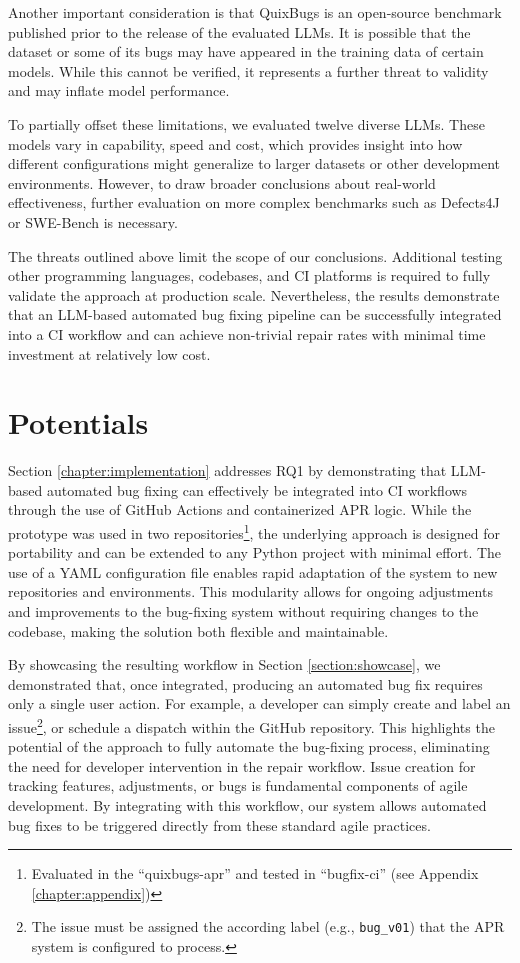 Another important consideration is that QuixBugs is an open-source benchmark published prior to the release of the evaluated \acp{LLM}. It is possible that the dataset or some of its bugs may have appeared in the training data of certain models. While this cannot be verified, it represents a further threat to validity and may inflate model performance.

To partially offset these limitations, we evaluated twelve diverse \acp{LLM}. These models vary in capability, speed and cost, which provides insight into how different configurations might generalize to larger datasets or other development environments. However, to draw broader conclusions about real-world effectiveness, further evaluation on more complex benchmarks such as Defects4J or SWE-Bench is necessary.

The threats outlined above limit the scope of our conclusions. Additional testing other programming languages, codebases, and CI platforms is required to fully validate the approach at production scale. Nevertheless, the results demonstrate that an LLM-based automated bug fixing pipeline can be successfully integrated into a CI workflow and can achieve non-trivial repair rates with minimal time investment at relatively low cost.

\section{Potentials}

Section \ref{chapter:implementation} addresses RQ1 by demonstrating that LLM-based automated bug fixing can effectively be integrated into \ac{CI} workflows through the use of GitHub Actions and containerized APR logic. While the prototype was used in two repositories\footnote{Evaluated in the ``quixbugs-apr'' and tested in ``bugfix-ci'' (see Appendix \ref{chapter:appendix})}, the underlying approach is designed for portability and can be extended to any Python project with minimal effort. The use of a YAML configuration file enables rapid adaptation of the system to new repositories and environments. This modularity allows for ongoing adjustments and improvements to the bug-fixing system without requiring changes to the codebase, making the solution both flexible and maintainable.

By showcasing the resulting workflow in Section \ref{section:showcase}, we demonstrated that, once integrated, producing an automated bug fix requires only a single user action. For example, a developer can simply create and label an issue\footnote{The issue must be assigned the according label (e.g., \texttt{bug\_v01}) that the APR system is configured to process.}, or schedule a dispatch within the GitHub repository. This highlights the potential of the approach to fully automate the bug-fixing process, eliminating the need for developer intervention in the repair workflow. Issue creation for tracking features, adjustments, or bugs is fundamental components of agile development. \cite{abrahamssonAgileSoftwareDevelopment2017} By integrating with this workflow, our system allows automated bug fixes to be triggered directly from these standard agile practices.


